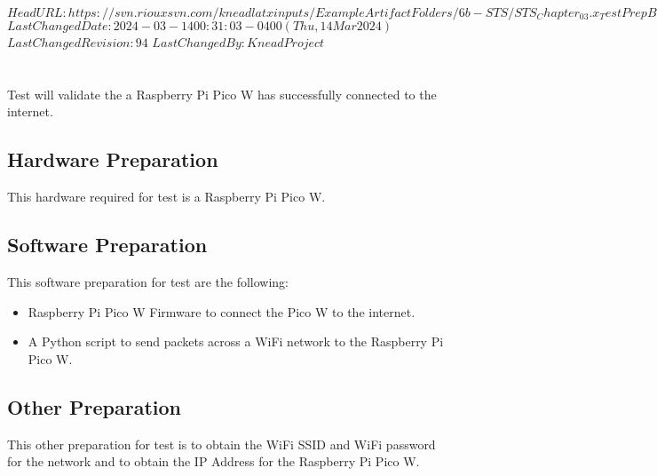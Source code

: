 \svnidlong
{$HeadURL: https://svn.riouxsvn.com/kneadlatxinputs/ExampleArtifactFolders/6b-STS/STS_Chapter_03.x_TestPrepBase.tex $}
{$LastChangedDate: 2024-03-14 00:31:03 -0400 (Thu, 14 Mar 2024) $}
{$LastChangedRevision: 94 $}
{$LastChangedBy: KneadProject $}

\section{\StsTestID}
\label{loc:Prep\StsTestID}
% 

Test  will validate the a Raspberry Pi Pico W has successfully connected to the internet.

\subsection{Hardware Preparation}
\label{loc:HardwarePrep\StsTestID}
% 

This hardware required for test  is a Raspberry Pi Pico W.

\subsection{Software Preparation}
\label{loc:SoftwarePrep\StsTestID}
% 

This software preparation for test  are the following:

\begin{itemize}
    \item Raspberry Pi Pico W Firmware to connect the Pico W to the internet.
    \item A Python script to send packets across a WiFi network to the Raspberry Pi Pico W.
\end{itemize}

\subsection{Other Preparation}
\label{loc:OtherPrep\StsTestID}
% 

This other preparation for test  is to obtain the WiFi SSID and WiFi password for the network and to obtain the IP Address for the Raspberry Pi Pico W.
